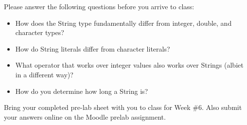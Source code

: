 Please answer the following questions before you arrive to class:

\begin{exer}

\begin{itemize}

\item How does the String type fundamentally differ from integer, double, and character types?

  \evalline
  
\item How do String literals differ from character literals?

  \evalline
  
\item What operator that works over integer values also works over Strings (albiet in a different way)?

  \evalline
  
\item How do you determine how long a String is?

  \evalline
  
  
\end{itemize}

\end{exer}

Bring your completed pre-lab sheet with you to class for Week \#6. Also submit your answers online on the Moodle prelab assignment.  

